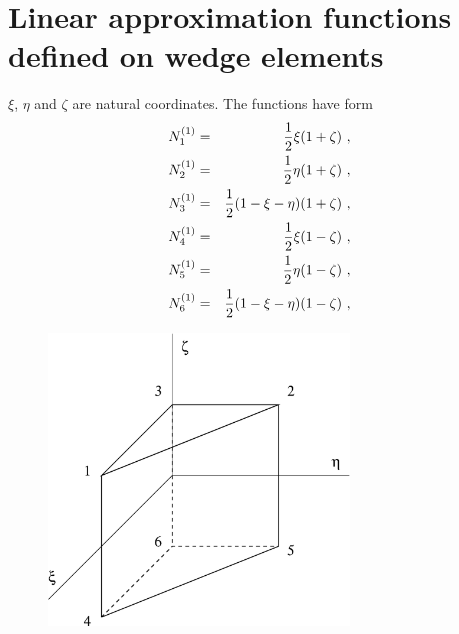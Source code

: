 
\section{Linear approximation functions defined on wedge elements}
$\xi$, $\eta$ and $\zeta$ are natural coordinates. The functions have form
\begin{eqnarray}
\label{bflinwedn1}
N_1^{(1)} &=& \mbox{$\displaystyle\frac{1}{2}$} \xi (1 + \zeta)\ ,
\\ \label{bflinwedn2}
N_2^{(1)} &=& \mbox{$\displaystyle\frac{1}{2}$} \eta (1 + \zeta)\ ,
\\ \label{bflinwedn3}
N_3^{(1)} &=& \mbox{$\displaystyle\frac{1}{2}$} (1 - \xi -\eta) (1 + \zeta)\ ,
\\ \label{bflinwedn4}
N_4^{(1)} &=& \mbox{$\displaystyle\frac{1}{2}$} \xi (1 - \zeta)\ ,
\\ \label{bflinwedn5}
N_5^{(1)} &=& \mbox{$\displaystyle\frac{1}{2}$} \eta (1 - \zeta)\ ,
\\ \label{bflinwedn6}
N_6^{(1)} &=& \mbox{$\displaystyle\frac{1}{2}$} (1 - \xi -\eta) (1 - \zeta)\ ,
\end{eqnarray}
\begin{figure}
\begin{center}
\includegraphics[width=80mm]{FIG/linwedge.eps}
\end{center}
\end{figure}

